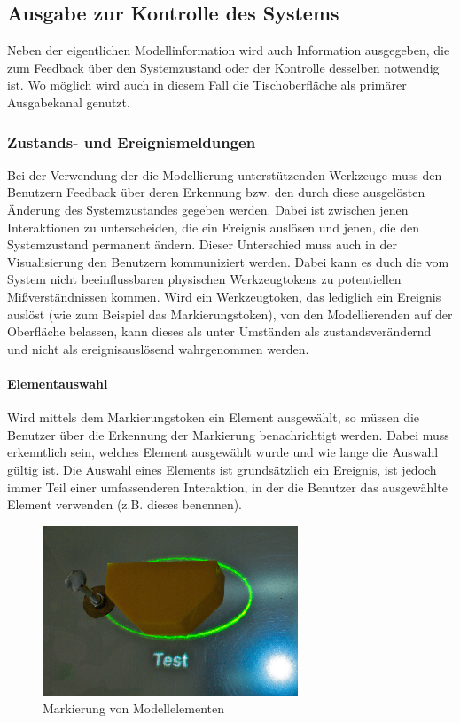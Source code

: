 \subsection{Ausgabe zur Kontrolle des Systems} %
\label{sub:ausgabe_zur_kontrolle_des_systems}

Neben der eigentlichen Modellinformation wird auch Information ausgegeben, die zum Feedback über den Systemzustand oder der Kontrolle desselben notwendig ist. Wo möglich wird auch in diesem Fall die Tischoberfläche als primärer Ausgabekanal genutzt.

\subsubsection{Zustands- und Ereignismeldungen} %
\label{ssub:zustands_und_ereignismeldungen}

Bei der Verwendung der die Modellierung unterstützenden Werkzeuge muss den Benutzern Feedback über deren Erkennung bzw. den durch diese ausgelösten Änderung des Systemzustandes gegeben werden. Dabei ist zwischen jenen Interaktionen zu unterscheiden, die ein Ereignis auslösen und jenen, die den Systemzustand permanent ändern. Dieser Unterschied muss auch in der Visualisierung den Benutzern kommuniziert werden. Dabei kann es duch die vom System nicht beeinflussbaren physischen Werkzeugtokens zu potentiellen Mißverständnissen kommen. Wird ein Werkzeugtoken, das lediglich ein Ereignis auslöst (wie zum Beispiel das Markierungstoken), von den Modellierenden auf der Oberfläche belassen, kann dieses als unter Umständen als zustandsverändernd und nicht als ereignisauslösend wahrgenommen werden. 

\paragraph{Elementauswahl}

Wird mittels dem Markierungstoken ein Element ausgewählt, so müssen die Benutzer über die Erkennung der Markierung benachrichtigt werden. Dabei muss erkenntlich sein, welches Element ausgewählt wurde und wie lange die Auswahl gültig ist. Die Auswahl eines Elements ist grundsätzlich ein Ereignis, ist jedoch immer Teil einer umfassenderen Interaktion, in der die Benutzer das ausgewählte Element verwenden (z.B. dieses benennen).

\begin{figure}[htbp]
	\centering
		\includegraphics[height=2in]{img/SystemNeu/MarkierungTisch.jpg}
	\caption{Markierung von Modellelementen}
	\label{fig:img_SystemNeu_MarkierungTisch}
\end{figure}

